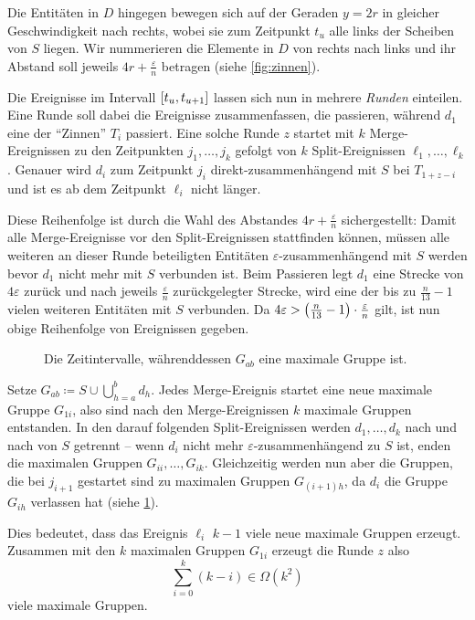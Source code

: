 \begin{beweis}
	Die Entitäten in $D$ hingegen bewegen sich auf der Geraden $y=2r$ in gleicher Geschwindigkeit nach rechts, wobei sie zum Zeitpunkt $t_u$ alle links der Scheiben von $S$ liegen.
	Wir nummerieren die Elemente in $D$ von rechts nach links und ihr Abstand soll jeweils $4r + \frac{\varepsilon}{n}$ betragen (siehe \cref{fig:zinnen}).
	
	Die Ereignisse im Intervall $\benbrace*{t_u,t_{u+1}}$ lassen sich nun in mehrere \emph{Runden} einteilen.
	Eine Runde soll dabei die Ereignisse zusammenfassen, die passieren, während $d_1$ eine der \enquote{Zinnen} $T_i$ passiert.
	Eine solche Runde $z$ startet mit $k$ Merge-Ereignissen zu den Zeitpunkten $j_1, \ldots , j_k$ gefolgt von $k$ Split-Ereignissen $\ell_1, \ldots, \ell_k$. 
	Genauer wird $d_i$ zum Zeitpunkt $j_i$ direkt-zusammenhängend mit $S$ bei $T_{1+z-i}$ und ist es ab dem Zeitpunkt $\ell_i$ nicht länger.
	
	Diese Reihenfolge ist durch die Wahl des Abstandes $4r + \frac{\varepsilon}{n}$ sichergestellt: Damit alle Merge-Ereignisse vor den Split-Ereignissen stattfinden können, müssen alle weiteren an dieser Runde beteiligten Entitäten $\varepsilon$-zusammenhängend mit $S$ werden bevor $d_1$ nicht mehr mit $S$ verbunden ist.
	Beim Passieren legt $d_1$ eine Strecke von $4 \varepsilon$ zurück und nach jeweils $\frac{\varepsilon}{n}$ zurückgelegter Strecke, wird eine der bis zu $\frac{n}{13}-1$ vielen weiteren Entitäten mit $S$ verbunden.
	Da $4 \varepsilon > \enbrace*{\frac{n}{13}-1 } \cdot \frac{\varepsilon}{n}$ gilt, ist nun obige Reihenfolge von Ereignissen gegeben.
	
	\begin{figure}[hbtp]
		\Centering
		\caption{Die Zeitintervalle, währenddessen $G_{ab}$ eine maximale Gruppe ist.}\label{fig:gruppen-intervalle}
	\end{figure}
	
	Setze $G_{ab} \coloneqq S \cup \bigcup_{h=a}^b d_h$.
	Jedes Merge-Ereignis startet eine neue maximale Gruppe $G_{1i}$, also sind nach den Merge-Ereignissen $k$ maximale Gruppen entstanden.
	In den darauf folgenden Split-Ereignissen werden $d_1, \ldots , d_k$ nach und nach von $S$ getrennt -- wenn $d_i$ nicht mehr $\varepsilon$-zusammenhängend zu $S$ ist, enden die maximalen Gruppen $G_{ii}, \ldots , G_{ik}$.
	Gleichzeitig werden nun aber die Gruppen, die bei $j_{i+1}$ gestartet sind zu maximalen Gruppen $G_{(i+1)h}$, da $d_i$ die Gruppe $G_{ih}$ verlassen hat (siehe \cref{fig:gruppen-intervalle}).
	
	Dies bedeutet, dass das Ereignis $\ell_i$ $k-1$ viele neue maximale Gruppen erzeugt.
	Zusammen mit den $k$ maximalen Gruppen $G_{1i}$ erzeugt die Runde $z$ also 
	\[
		\sum_{i=0}^{k} (k-i)  \in \Omega(k^2)
	\]
	viele maximale Gruppen.
\end{beweis}

